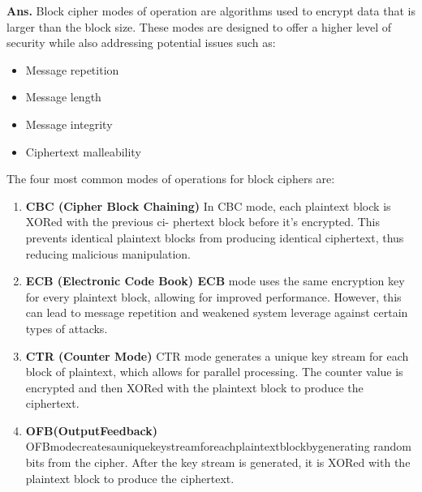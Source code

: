 \documentclass{article}
\begin{document}
\begin{enumerate}
	\textbf{Ans.} Block cipher modes of operation are algorithms used to encrypt data that is larger than the block size. These modes are designed to offer a higher level of security while also addressing potential issues such as:
	\begin{itemize}
		\item Message repetition
		\item Message length
		\item Message integrity
		\item Ciphertext malleability
	\end{itemize}
	The four most common modes of operations for block ciphers are:
	\begin{enumerate}
		\item \textbf{CBC (Cipher Block Chaining)} In CBC mode, each plaintext block is XORed with the previous ci- phertext block before it’s encrypted. This prevents identical plaintext blocks from producing identical ciphertext, thus reducing malicious manipulation.
		\item \textbf{ECB (Electronic Code Book) ECB} mode uses the same encryption key for every plaintext block, allowing for improved performance. However, this can lead to message repetition and weakened system leverage against certain types of attacks.
		\item \textbf{CTR (Counter Mode)} CTR mode generates a unique key stream for each block of plaintext, which allows for parallel processing. The counter value is encrypted and then XORed with the plaintext block to produce the ciphertext.
		\item \textbf{OFB(OutputFeedback)} OFBmodecreatesauniquekeystreamforeachplaintextblockbygenerating random bits from the cipher. After the key stream is generated, it is XORed with the plaintext block to produce the ciphertext.
	\end{enumerate}
\end{enumerate}
\end{document}
